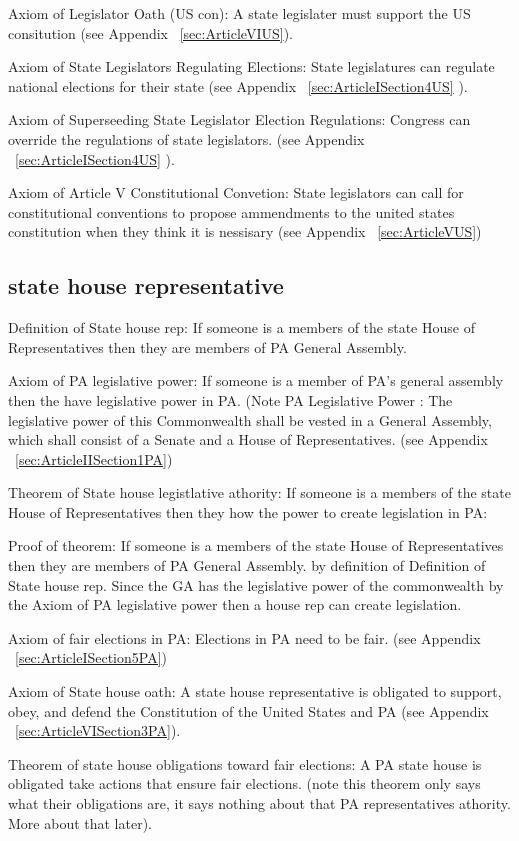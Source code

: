 \documentclass[11pt]{article} %
\begin{document}
\begin{enumerate}
Axiom of  Legislator Oath (US con):  A state legislater must support the US consitution (see Appendix ~\ref{sec:ArticleVIUS}).

Axiom of State Legislators Regulating Elections: State legislatures can regulate national elections for their state (see Appendix ~\ref{sec:ArticleISection4US} ).

Axiom of Superseeding State Legislator Election Regulations:  Congress can override the regulations of state legislators.   (see Appendix ~\ref{sec:ArticleISection4US} ).

Axiom of Article V Constitutional Convetion:  State legislators can call for constitutional conventions to propose ammendments to the united states constitution when they think it is nessisary (see Appendix  ~\ref{sec:ArticleVUS})

\subsection{state house representative}

Definition of State house rep: If someone is a members of the state House of Representatives then they are members of PA General Assembly.

Axiom of PA legislative power:  If someone is a member of PA's general assembly then the have legislative power in PA.  (Note PA Legislative Power : The legislative power of this Commonwealth shall be vested in a General Assembly, which shall consist of a Senate and a House of Representatives. (see Appendix ~\ref{sec:ArticleIISection1PA})

Theorem of State house legistlative athority: If someone is a members of the state House of Representatives then they how the power to create legislation in PA: 

Proof of theorem:
If someone is a members of the state House of Representatives then they are members of PA General Assembly. by definition of Definition of State house rep.  Since the GA has the legislative power of the commonwealth by the Axiom of PA legislative power then a house rep can create legislation. 

Axiom of fair elections in PA: Elections in PA need to be fair. (see Appendix ~\ref{sec:ArticleISection5PA})

Axiom of State house oath: A state house representative is obligated to support, obey, and defend the  Constitution of the United States and PA (see Appendix ~\ref{sec:ArticleVISection3PA}).

Theorem of state house obligations toward fair elections:  A PA state house is obligated take actions that ensure fair elections. (note this theorem only says what their obligations are, it says nothing about that PA representatives athority. More about that later).


\end{enumerate}
\end{document}
